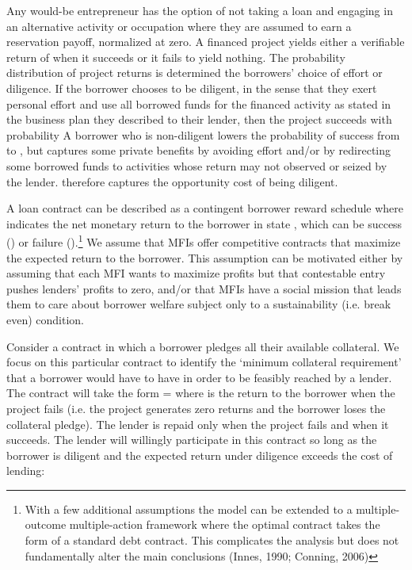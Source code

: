 \documentclass{article}
\begin{document}
Any would-be entrepreneur has the option of not taking a loan and
engaging in an alternative activity or occupation where they are assumed
to earn a reservation payoff, normalized at zero. A financed project
yields either a verifiable return of when it succeeds or it fails to
yield nothing. The probability distribution of project returns is
determined the borrowers' choice of effort or diligence. If the borrower
chooses to be diligent, in the sense that they exert personal effort and
use all borrowed funds for the financed activity as stated in the
business plan they described to their lender, then the project succeeds
with probability A borrower who is non-diligent lowers the probability
of success from to , but captures some private benefits by avoiding
effort and/or by redirecting some borrowed funds to activities whose
return may not observed or seized by the lender. therefore captures the
opportunity cost of being diligent.

A loan contract can be described as a contingent borrower reward
schedule where indicates the net monetary return to the borrower in
state , which can be success () or failure ().\footnote{With a few
  additional assumptions the model can be extended to a multiple-outcome
  multiple-action framework where the optimal contract takes the form of
  a standard debt contract. This complicates the analysis but does not
  fundamentally alter the main conclusions (Innes, 1990; Conning, 2006)}
We assume that MFIs offer competitive contracts that maximize the
expected return to the borrower. This assumption can be motivated either
by assuming that each MFI wants to maximize profits but that contestable
entry pushes lenders' profits to zero, and/or that MFIs have a social
mission that leads them to care about borrower welfare subject only to a
sustainability (i.e. break even) condition.

Consider a contract in which a borrower pledges all their available
collateral. We focus on this particular contract to identify the
`minimum collateral requirement' that a borrower would have to have in
order to be feasibly reached by a lender. The contract will take the
form = where is the return to the borrower when the project fails (i.e.
the project generates zero returns and the borrower loses the collateral
pledge). The lender is repaid only when the project fails and when it
succeeds. The lender will willingly participate in this contract so long
as the borrower is diligent and the expected return under diligence
exceeds the cost of lending:
\end{document}
